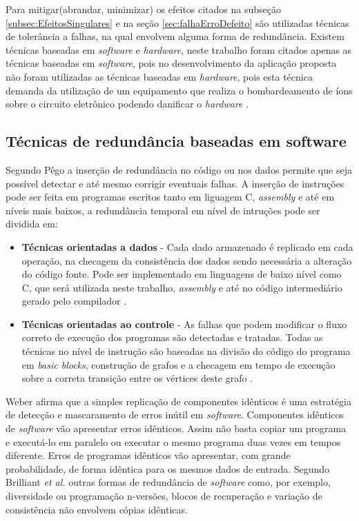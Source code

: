 Para mitigar(abrandar, minimizar) os efeitos citados na subseção \ref{subsec:EfeitosSingulares} e na seção \ref{sec:falhaErroDefeito} são utilizadas técnicas de tolerância a falhas, na qual envolvem alguma forma de redundância.  
Existem técnicas baseadas em \textit{software} e \textit{hardware}, neste trabalho foram citados apenas as técnicas baseadas em \textit{software}, pois no desenvolvimento da aplicação proposta não foram utilizadas as técnicas baseadas em \textit{hardware}, pois esta técnica demanda da utilização de um equipamento que realiza o bombardeamento de íons sobre o circuito eletrônico podendo danificar o \textit{hardware} \cite{Weber:2002}.

\subsection{Técnicas de redundância baseadas em software}

Segundo Pêgo \cite{Pego:2014} a inserção de redundância no código ou nos dados permite que seja possível detectar e até mesmo corrigir eventuais falhas. A inserção de instruções pode ser feita em programas escritos tanto em liguagem C, \textit{assembly} e até em níveis mais baixos, a redundância temporal em nível de intruções pode ser dividida em:


\begin{itemize}
	\item \textbf{Técnicas orientadas a dados} - Cada dado armazenado é replicado em cada operação, na checagem da consistência dos dados sendo necessária a alteração do código fonte. Pode ser implementado em linguagens de baixo nível como C, que será utilizada neste trabalho, \textit{assembly} e até no código intermediário gerado pelo compilador \cite{Pego:2014}.
	
	\item \textbf{Técnicas orientadas ao controle} - As falhas que podem modificar o fluxo correto de execução dos programas são detectadas e tratadas. Todas as técnicas no nível de instrução são baseadas na divisão do código do programa em \textit{basic blocks}, construção de grafos e a checagem em tempo de execução sobre a correta transição entre os vértices deste grafo \cite{Pego:2014}.  		 
	
\end{itemize}


Weber \cite{Weber:2002} afirma que a simples replicação de componentes idênticos é uma estratégia de detecção e mascaramento de erros inútil em \textit{software}. Componentes idênticos de \textit{software} vão apresentar erros idênticos. Assim não basta copiar um programa e executá-lo em paralelo ou executar o mesmo programa duas vezes em tempos diferente. Erros de programas idênticos vão apresentar, com grande probabilidade, de forma idêntica para os mesmos dados de entrada. Segundo Brilliant \textit{et al.}\cite{Brilliant:1990} outras formas de redundância de \textit{software} como, por exemplo, diversidade ou programação n-versões, blocos de recuperação e variação de consistência não envolvem cópias idênticas.

